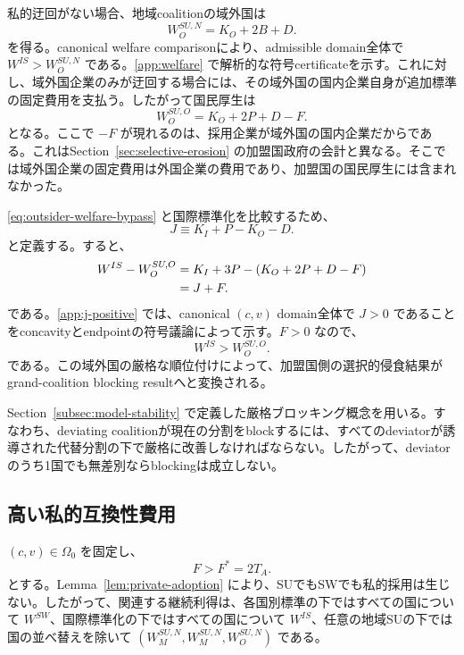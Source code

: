 私的迂回がない場合、地域coalitionの域外国は
\begin{equation}
    W_O^{SU,N}=K_O+2B+D.
    \label{eq:outsider-welfare-no-bypass}
\end{equation}
を得る。canonical welfare comparisonにより、admissible domain全体で $W^{IS}>W_O^{SU,N}$ である。\ref{app:welfare} で解析的な符号certificateを示す。これに対し、域外国企業のみが迂回する場合には、その域外国の国内企業自身が追加標準の固定費用を支払う。したがって国民厚生は
\begin{equation}
    W_O^{SU,O}=K_O+2P+D-F.
    \label{eq:outsider-welfare-bypass}
\end{equation}
となる。ここで $-F$ が現れるのは、採用企業が域外国の国内企業だからである。これはSection~\ref{sec:selective-erosion} の加盟国政府の会計と異なる。そこでは域外国企業の固定費用は外国企業の費用であり、加盟国の国民厚生には含まれなかった。

\eqref{eq:outsider-welfare-bypass} と国際標準化を比較するため、
\begin{equation}
    J\equiv K_I+P-K_O-D.
    \label{eq:j-definition}
\end{equation}
と定義する。すると、
\begin{align}
    W^{IS}-W_O^{SU,O}
    &=K_I+3P-\left(K_O+2P+D-F\right)\notag\\
    &=J+F.
    \label{eq:outsider-is-gap}
\end{align}
である。\ref{app:j-positive} では、canonical $(c,v)$ domain全体で $J>0$ であることをconcavityとendpointの符号議論によって示す。$F>0$ なので、
\begin{equation}
    \boxed{W^{IS}>W_O^{SU,O}.}
    \label{eq:outsider-prefers-is-after-bypass}
\end{equation}
である。この域外国の厳格な順位付けによって、加盟国側の選択的侵食結果がgrand-coalition blocking resultへと変換される。

Section~\ref{subsec:model-stability} で定義した厳格ブロッキング概念を用いる。すなわち、deviating coalitionが現在の分割をblockするには、すべてのdeviatorが誘導された代替分割の下で厳格に改善しなければならない。したがって、deviatorのうち1国でも無差別ならblockingは成立しない。

\subsection{高い私的互換性費用}
\label{subsec:high-f-stability}

$(c,v)\in\Omega_0$ を固定し、
\begin{equation}
    F>F^\ast=2T_A.
    \label{eq:high-f-region-stability}
\end{equation}
とする。Lemma~\ref{lem:private-adoption} により、SUでもSWでも私的採用は生じない。したがって、関連する継続利得は、各国別標準の下ではすべての国について $W^{SW}$、国際標準化の下ではすべての国について $W^{IS}$、任意の地域SUの下では国の並べ替えを除いて $(W_M^{SU,N},W_M^{SU,N},W_O^{SU,N})$ である。

